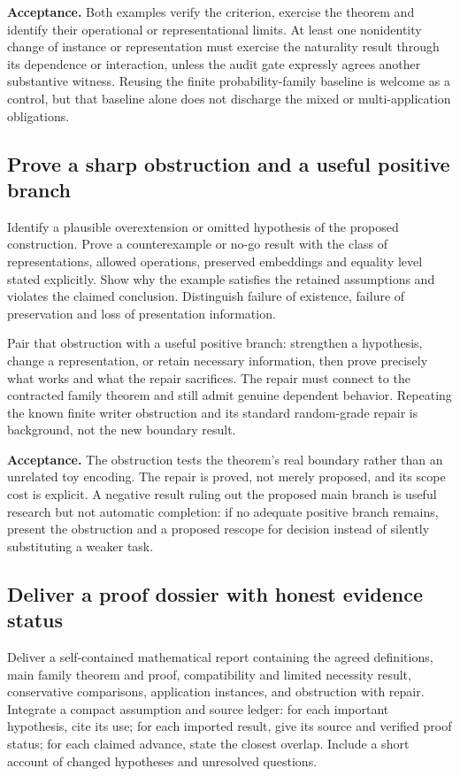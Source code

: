 \documentclass[11pt,a4paper]{article}
\begin{document}
\textbf{Acceptance.} Both examples verify the criterion, exercise the theorem
and identify their operational or representational limits. At least one
nonidentity change of instance or representation must exercise the naturality
result through its dependence or interaction, unless the audit gate expressly
agrees another substantive witness. Reusing the
finite probability-family baseline is welcome as a control, but that baseline
alone does not discharge the mixed or multi-application obligations.

\subsection{Prove a sharp obstruction and a useful positive branch}

Identify a plausible overextension or omitted hypothesis of the proposed
construction. Prove a counterexample or no-go result with the class of
representations, allowed operations, preserved embeddings and equality level
stated explicitly. Show why the example satisfies the retained assumptions
and violates the claimed conclusion. Distinguish failure of existence,
failure of preservation and loss of presentation information.

Pair that obstruction with a useful positive branch: strengthen a hypothesis,
change a representation, or retain necessary information, then prove precisely
what works and what the repair sacrifices. The repair must connect to the
contracted family theorem and still admit genuine dependent behavior. Repeating
the known finite writer obstruction and its standard random-grade repair is
background, not the new boundary result.

\textbf{Acceptance.} The obstruction tests the theorem's real boundary rather
than an unrelated toy encoding. The repair is proved, not merely proposed, and
its scope cost is explicit. A negative result ruling out the proposed main
branch is useful research but not automatic completion: if no adequate
positive branch remains, present the obstruction and a proposed rescope for
decision instead of silently substituting a weaker task.

\subsection{Deliver a proof dossier with honest evidence status}

Deliver a self-contained mathematical report containing the agreed definitions,
main family theorem and proof, compatibility and limited necessity result,
conservative comparisons, application instances, and obstruction with repair.
Integrate a compact assumption and source ledger: for each important
hypothesis, cite its use; for each imported result, give its source and verified
proof status; for each claimed advance, state the closest overlap. Include a
short account of changed hypotheses and unresolved questions.
\end{document}
